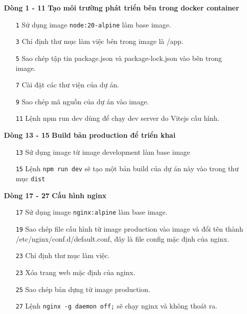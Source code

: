 \documentclass[a4paper, 11pt]{article}
\begin{document}
\begin{itemize}
          \begin{itemize}
              \item [\textbf{Dòng 1 - 11}] \textbf{Tạo môi trường phát triển bên trong docker container}
                    \begin{itemize}
                        \item [\texttt{1}] Sử dụng image \texttt{node:20-alpine} làm base image.
                        \item [\texttt{3}] Chỉ định thư mục làm việc bên trong image là /app.
                        \item [\texttt{5}] Sao chép tập tin package.json và package-lock.json vào bên trong image.
                        \item [\texttt{7}] Cài đặt các thư viện của dự án.
                        \item [\texttt{9}] Sao chép mã nguồn của dự án vào image.
                        \item [\texttt{11}] Lệnh npm run dev dùng để chạy dev server do Vitejs cấu hình.
                    \end{itemize}
              \item [\textbf{Dòng 13 - 15}] \textbf{Build bản production để triển khai}
                    \begin{itemize}
                        \item [\texttt{13}] Sử dụng image từ image development làm base image
                        \item [\texttt{15}] Lệnh \texttt{npm run dev} sẽ tạo một bản build của dự án này vào trong thư mục \texttt{dist}
                    \end{itemize}
              \item [\textbf{Dòng 17 - 27}] \textbf{Cấu hình nginx}
                    \begin{itemize}
                        \item [\texttt{17}] Sử dụng image \texttt{nginx:alpine} làm base image.
                        \item [\texttt{19}] Sao chép file cấu hình từ image production vào image và đổi tên thành /etc/nginx/conf.d/default.conf, đây là file config mặc định của nginx.
                        \item [\texttt{23}] Chỉ định thư mục làm việc.
                        \item [\texttt{23}] Xóa trang web mặc định của nginx.
                        \item [\texttt{25}] Sao chép bản dựng từ image production.
                        \item [\texttt{27}] Lệnh \texttt{nginx -g daemon off;} sẽ chạy nginx và không thoát ra.
                    \end{itemize}
          \end{itemize}


\end{itemize}
\end{document}
